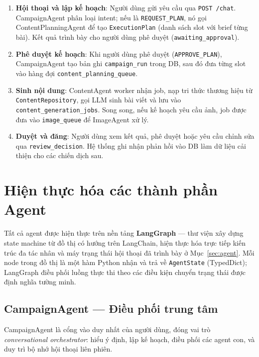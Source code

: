 \begin{enumerate}
  \item \textbf{Hội thoại và lập kế hoạch}: Người dùng gửi yêu cầu qua
    \texttt{POST /chat}. CampaignAgent phân loại intent; nếu là
    \texttt{REQUEST\_PLAN}, nó gọi ContentPlanningAgent để tạo
    \texttt{ExecutionPlan} (danh sách slot với brief từng bài). Kết quả
    trình bày cho người dùng phê duyệt (\texttt{awaiting\_approval}).
  \item \textbf{Phê duyệt kế hoạch}: Khi người dùng phê duyệt
    (\texttt{APPROVE\_PLAN}), CampaignAgent tạo bản ghi
    \texttt{campaign\_run} trong DB, sau đó đưa từng slot vào hàng đợi
    \texttt{content\_planning\_queue}.
  \item \textbf{Sinh nội dung}: ContentAgent worker nhận job, nạp tri
    thức thương hiệu từ \texttt{ContentRepository}, gọi LLM sinh bài
    viết và lưu vào \texttt{content\_generation\_jobs}. Song song, nếu
    kế hoạch yêu cầu ảnh, job được đưa vào \texttt{image\_queue} để
    ImageAgent xử lý.
  \item \textbf{Duyệt và đăng}: Người dùng xem kết quả, phê duyệt hoặc
    yêu cầu chỉnh sửa qua \texttt{review\_decision}. Hệ thống ghi
    nhận phản hồi vào DB làm dữ liệu cải thiện cho các chiến dịch
    sau.
\end{enumerate}

\section{Hiện thực hóa các thành phần Agent}\label{sec:hien-thuc-agent}

Tất cả agent được hiện thực trên nền tảng \textbf{LangGraph} --- thư
viện xây dựng state machine từ đồ thị có hướng trên LangChain, hiện
thực hóa trực tiếp kiến trúc đa tác nhân và máy trạng thái hội thoại
đã trình bày ở Mục~\ref{sec:agent}. Mỗi node trong đồ thị là một hàm
Python nhận và trả về \texttt{AgentState} (TypedDict); LangGraph điều
phối luồng thực thi theo các điều kiện chuyển trạng thái được định
nghĩa tường minh.

\subsection{CampaignAgent --- Điều phối trung tâm}

CampaignAgent là cổng vào duy nhất của người dùng, đóng vai trò
\emph{conversational orchestrator}: hiểu ý định, lập kế hoạch, điều
phối các agent con, và duy trì bộ nhớ hội thoại liên phiên.

